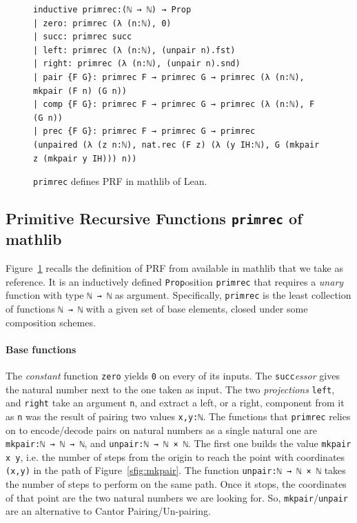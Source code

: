 \documentclass[preprint]{elsarticle}
\theoremstyle{remark}
\newcommand{\PRF}{\textsf{PRF}\xspace}
\newcommand{\MATHLIB}{\textsf{mathlib}\xspace}
\newcommand{\LEAN}{\textsf{Lean}\xspace}
\begin{document}
\begin{figure}
\begin{lstlisting}[basicstyle=\small]
inductive primrec:(ℕ → ℕ) → Prop
| zero: primrec (λ (n:ℕ), 0)
| succ: primrec succ
| left: primrec (λ (n:ℕ), (unpair n).fst)
| right: primrec (λ (n:ℕ), (unpair n).snd)
| pair {F G}: primrec F → primrec G → primrec (λ (n:ℕ), mkpair (F n) (G n))
| comp {F G}: primrec F → primrec G → primrec (λ (n:ℕ), F (G n))
| prec {F G}: primrec F → primrec G → primrec
(unpaired (λ (z n:ℕ), nat.rec (F z) (λ (y IH:ℕ), G (mkpair z (mkpair y IH))) n))
\end{lstlisting}
\caption{\lstinline|primrec| defines \PRF in \MATHLIB of \LEAN.}
\label{fig: primrec}
\end{figure}


\subsection{Primitive Recursive Functions \texorpdfstring{\normalfont \lstinline|primrec|}{primrec} of \MATHLIB }
\label{section:Unary Primitive Recursive Functions}

Figure~\ref{fig: primrec} recalls the definition of \PRF from \cite{Carneiro-primrecMathlib} available in \MATHLIB that we take as reference. It is an inductively defined \lstinline|Prop|osition \lstinline|primrec| that requires a \emph{unary} function with type \lstinline|ℕ → ℕ| as argument. Specifically, \lstinline|primrec| is the least collection of functions \lstinline|ℕ → ℕ| with a given set of base elements, closed under some composition schemes.

\paragraph{Base functions}
The \emph{constant} function \lstinline|zero| yields \lstinline|0| on every of its inputs.
The \lstinline|succ|\emph{essor} gives the natural number next to the one taken as input.
The two \emph{projections} \lstinline|left|, and \lstinline|right| take an argument \lstinline|n|, and extract a left, or a right, component from it as \lstinline|n| was the result of pairing two values \lstinline|x,y:ℕ|. The functions that \lstinline|primrec| relies on to encode/decode pairs on natural numbers as a single natural one are \lstinline|mkpair:ℕ → ℕ → ℕ|, and \lstinline|unpair:ℕ → ℕ × ℕ|. The first one builds the value \lstinline|mkpair x y|, i.e. the number of steps from the origin to reach the point with coordinates \lstinline|(x,y)| in the path of Figure~\ref{sfig:mkpair}. The function \lstinline|unpair:ℕ → ℕ × ℕ| takes the number of steps to perform on the same path. Once it stops, the coordinates of that point are the two natural numbers we are looking for. So, \lstinline|mkpair|/\lstinline|unpair| are an alternative to Cantor Pairing/Un-pairing.
\end{document}
